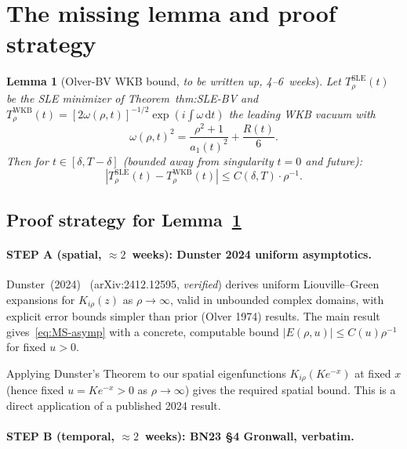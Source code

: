 \documentclass[11pt]{article}
\newtheorem{lemma}[theorem]{Lemma}
\theoremstyle{definition}
\begin{document}
\section{The missing lemma and proof strategy}\label{sec:lemma}

\begin{lemma}[Olver-BV WKB bound, \emph{to be written up, 4--6~weeks}]\label{lem:WKB}
Let $T^{\mathrm{SLE}}_\rho(t)$ be the SLE minimizer of Theorem~\textup{thm:SLE-BV}
and $T^{\mathrm{WKB}}_\rho(t) = [2\omega(\rho,t)]^{-1/2}\exp(i\int\omega\,\mathrm{d}t)$
the leading WKB vacuum with
\[
\omega(\rho,t)^2 = \frac{\rho^2+1}{a_1(t)^2} + \frac{R(t)}{6}.
\]
Then for $t \in [\delta, T-\delta]$ (bounded away from singularity $t=0$ and future):
\begin{equation}\label{eq:WKB-bound}
|T^{\mathrm{SLE}}_\rho(t) - T^{\mathrm{WKB}}_\rho(t)| \le C(\delta,T)\cdot\rho^{-1}.
\end{equation}
\end{lemma}

\subsection{Proof strategy for Lemma~\ref{lem:WKB}}

\paragraph{STEP A (spatial, $\approx 2$~weeks): Dunster 2024 uniform asymptotics.}

Dunster~(2024)~\cite{Dunster2024} (arXiv:2412.12595, \emph{verified}) derives uniform
Liouville--Green expansions for $K_{i\rho}(z)$ as $\rho\to\infty$, valid in unbounded
complex domains, with explicit error bounds simpler than prior (Olver 1974) results.
The main result gives~\eqref{eq:MS-asymp} with a concrete, computable bound
$|E(\rho,u)| \le C(u)\rho^{-1}$ for fixed $u > 0$.

Applying Dunster's Theorem to our spatial eigenfunctions $K_{i\rho}(Ke^{-x})$
at fixed $x$ (hence fixed $u = Ke^{-x} > 0$ as $\rho\to\infty$) gives the required
spatial bound. This is a direct application of a published 2024 result.

\paragraph{STEP B (temporal, $\approx 2$~weeks): BN23 \S4 Gronwall, verbatim.}
\end{document}
